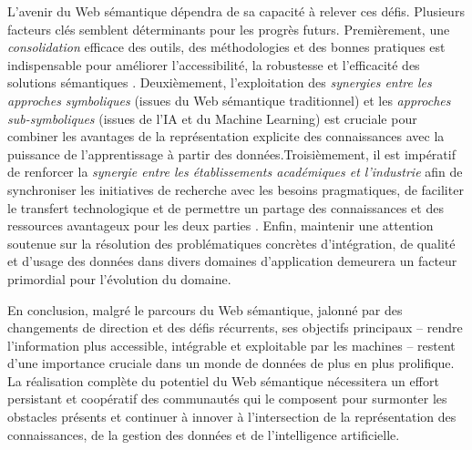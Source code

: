 \documentclass[9pt,twocolumn,twoside,french]{opticajnl}
\begin{document}
L'avenir du Web sémantique dépendra de sa capacité à relever ces défis. Plusieurs facteurs clés semblent déterminants pour les progrès futurs. Premièrement, une \textit{consolidation} efficace des outils, des méthodologies et des bonnes pratiques est indispensable pour améliorer l'accessibilité, la robustesse et l'efficacité des solutions sémantiques \citep{Hitzler2021}. Deuxièmement, l'exploitation des \textit{synergies entre les approches symboliques} (issues du Web sémantique traditionnel) et les \textit{approches sub-symboliques} (issues de l'IA et du Machine Learning) est cruciale pour combiner les avantages de la représentation explicite des connaissances avec la puissance de l'apprentissage à partir des données.Troisièmement, il est impératif de renforcer la \textit{synergie entre les établissements académiques et l'industrie} afin de synchroniser les initiatives de recherche avec les besoins pragmatiques, de faciliter le transfert technologique et de permettre un partage des connaissances et des ressources avantageux pour les deux parties \citep{Noy2019Industryscale}. Enfin, maintenir une attention soutenue sur la résolution des problématiques concrètes d'intégration, de qualité et d'usage des données dans divers domaines d'application demeurera un facteur primordial pour l'évolution du domaine.

En conclusion, malgré le parcours du Web sémantique, jalonné par des changements de direction et des défis récurrents, ses objectifs principaux – rendre l'information plus accessible, intégrable et exploitable par les machines – restent d'une importance cruciale dans un monde de données de plus en plus prolifique. La réalisation complète du potentiel du Web sémantique nécessitera un effort persistant et coopératif des communautés qui le composent pour surmonter les obstacles présents et continuer à innover à l'intersection de la représentation des connaissances, de la gestion des données et de l'intelligence artificielle.
\newline
 




\end{document}
